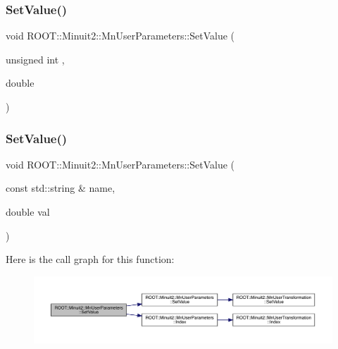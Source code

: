 \subsubsection{\texorpdfstring{SetValue()}{SetValue()}\hspace{0.1cm}{\footnotesize\ttfamily [3/6]}}
{\footnotesize\ttfamily void R\+O\+O\+T\+::\+Minuit2\+::\+Mn\+User\+Parameters\+::\+Set\+Value (\begin{DoxyParamCaption}\item[{unsigned int}]{,  }\item[{double}]{ }\end{DoxyParamCaption})}

\mbox{\label{classROOT_1_1Minuit2_1_1MnUserParameters_a83c0197f87bd6722f0ddfed4bf406fbe}} 
\subsubsection{\texorpdfstring{SetValue()}{SetValue()}\hspace{0.1cm}{\footnotesize\ttfamily [4/6]}}
{\footnotesize\ttfamily void R\+O\+O\+T\+::\+Minuit2\+::\+Mn\+User\+Parameters\+::\+Set\+Value (\begin{DoxyParamCaption}\item[{const std\+::string \&}]{name,  }\item[{double}]{val }\end{DoxyParamCaption})}

Here is the call graph for this function\+:
\nopagebreak
\begin{figure}[H]
\begin{center}
\leavevmode
\includegraphics[width=350pt]{d6/d10/classROOT_1_1Minuit2_1_1MnUserParameters_a83c0197f87bd6722f0ddfed4bf406fbe_cgraph}
\end{center}
\end{figure}
\mbox{\label{classROOT_1_1Minuit2_1_1MnUserParameters_a83c0197f87bd6722f0ddfed4bf406fbe}} 
